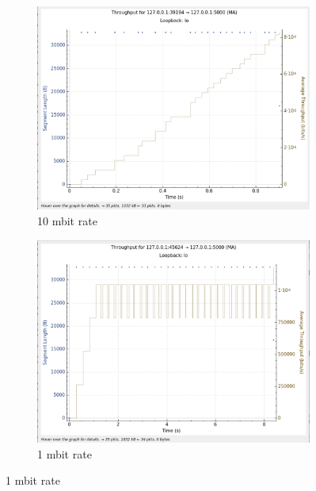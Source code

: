 \documentclass{report}
\begin{document}
\begin{figure}[H]
    \centering
    \begin{subfigure}[b]{0.45\textwidth}
        \centering
        \includegraphics[width=\textwidth]{Pics/Vegas/r10mbit_s1m_th}
        \caption{10 mbit rate}
    \end{subfigure}
    \hfill
    \begin{subfigure}[b]{0.45\textwidth}
        \centering
        \includegraphics[width=\textwidth]{Pics/Vegas/r1mbit_s1m_th}
        \caption{1 mbit rate}
    \end{subfigure}
    \medskip


\end{figure}
\end{document}
